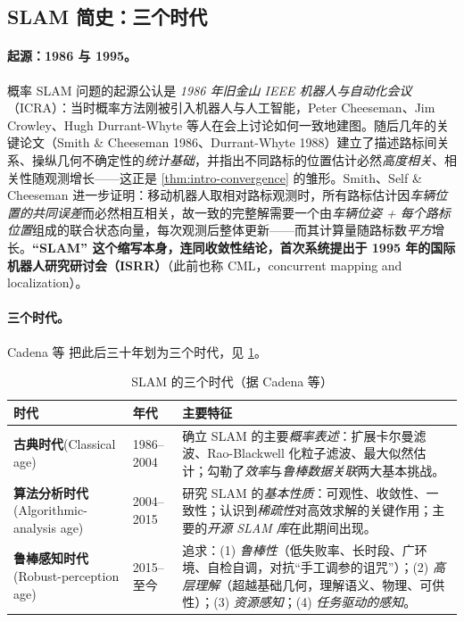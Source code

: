 \subsection{SLAM 简史：三个时代}
\label{sec:intro-history}

\paragraph{起源：1986 与 1995。}
概率 SLAM 问题的起源公认是 \emph{1986 年旧金山 IEEE 机器人与自动化会议}（ICRA）：当时概率方法刚被引入机器人与人工智能，Peter Cheeseman、Jim Crowley、Hugh Durrant-Whyte 等人在会上讨论如何一致地建图\cite{durrantwhyte2006slam}。随后几年的关键论文（Smith \& Cheeseman 1986、Durrant-Whyte 1988）建立了描述路标间关系、操纵几何不确定性的\emph{统计基础}，并指出不同路标的位置估计必然\emph{高度相关}、相关性随观测增长——这正是 \cref{thm:intro-convergence} 的雏形。Smith、Self \& Cheeseman 进一步证明：移动机器人取相对路标观测时，所有路标估计因\emph{车辆位置的共同误差}而必然相互相关，故一致的完整解需要一个由\emph{车辆位姿 + 每个路标位置}组成的联合状态向量，每次观测后整体更新——而其计算量随路标数\emph{平方}增长\cite{durrantwhyte2006slam}。\textbf{“SLAM” 这个缩写本身，连同收敛性结论，首次系统提出于 1995 年的国际机器人研究研讨会（ISRR）}\cite{durrantwhyte2006slam}（此前也称 CML，concurrent mapping and localization）。

\paragraph{三个时代。}
Cadena 等\cite{cadena2016past} 把此后三十年划为三个时代，见 \cref{tab:intro-eras}。

\begin{table}[H]\centering\small
\caption{SLAM 的三个时代（据 Cadena 等\cite{cadena2016past}）}
\label{tab:intro-eras}
\begin{tabular}{p{} p{} p{}}
\toprule
时代 & 年代 & 主要特征 \\
\midrule
\textbf{古典时代}\newline(Classical age) & 1986--2004 & 确立 SLAM 的主要\emph{概率表述}：扩展卡尔曼滤波、Rao-Blackwell 化粒子滤波、最大似然估计；勾勒了\emph{效率}与\emph{鲁棒数据关联}两大基本挑战。 \\
\textbf{算法分析时代}\newline(Algorithmic-analysis age) & 2004--2015 & 研究 SLAM 的\emph{基本性质}：可观性、收敛性、一致性；认识到\emph{稀疏性}对高效求解的关键作用；主要的\emph{开源 SLAM 库}在此期间出现。 \\
\textbf{鲁棒感知时代}\newline(Robust-perception age) & 2015--至今 & 追求：(1) \emph{鲁棒性}（低失败率、长时段、广环境、自检自调，对抗“手工调参的诅咒”）；(2) \emph{高层理解}（超越基础几何，理解语义、物理、可供性）；(3) \emph{资源感知}；(4) \emph{任务驱动的感知}。 \\
\bottomrule
\end{tabular}
\end{table}

